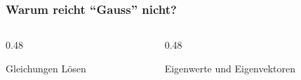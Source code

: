 %
%
%
\begin{frame}
\frametitle{Warum reicht ``Gauss'' nicht?}
\begin{columns}[t]
\begin{column}{0.48\hsize}
\begin{block}{Gleichungen Lösen}
\end{block}
\end{column}
\begin{column}{0.48\hsize}
\begin{block}{Eigenwerte und Eigenvektoren}
\end{block}
\end{column}
\end{columns}
\end{frame}
